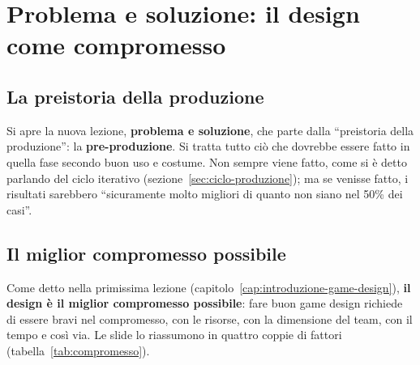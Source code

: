 \section{Problema e soluzione: il design come compromesso}
\label{sec:design-compromesso}



\subsection{La preistoria della produzione}

Si apre la nuova lezione, \textbf{problema e soluzione}, che parte dalla
``preistoria della produzione'': la \textbf{pre-produzione}. Si tratta tutto
ciò che dovrebbe essere fatto in quella fase secondo buon uso e costume. Non
sempre viene fatto, come si è detto parlando del ciclo iterativo
(sezione~\ref{sec:ciclo-produzione}); ma se venisse fatto, i risultati
sarebbero ``sicuramente molto migliori di quanto non siano nel 50\% dei
casi''.

\subsection{Il miglior compromesso possibile}

Come detto nella primissima lezione (capitolo~\ref{cap:introduzione-game-design}),
\textbf{il design è il miglior compromesso possibile}: fare buon game design
richiede di essere bravi nel compromesso, con le risorse, con la dimensione
del team, con il tempo e così via. Le slide lo riassumono in quattro coppie
di fattori (tabella~\ref{tab:compromesso}).

